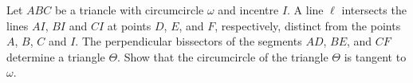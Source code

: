 Let $ABC$ be a triancle with circumcircle $\omega$ and incentre $I$.
A line $\ell$ intersects the lines $AI$, $BI$ and $CI$ at points $D$, $E$, and $F$, respectively, distinct from the points $A$, $B$, $C$ and $I$.
The perpendicular bissectors of the segments $AD$, $BE$, and $CF$ determine a triangle $\Theta$.
Show that the circumcircle of the triangle $\Theta$ is tangent to $\omega$.
